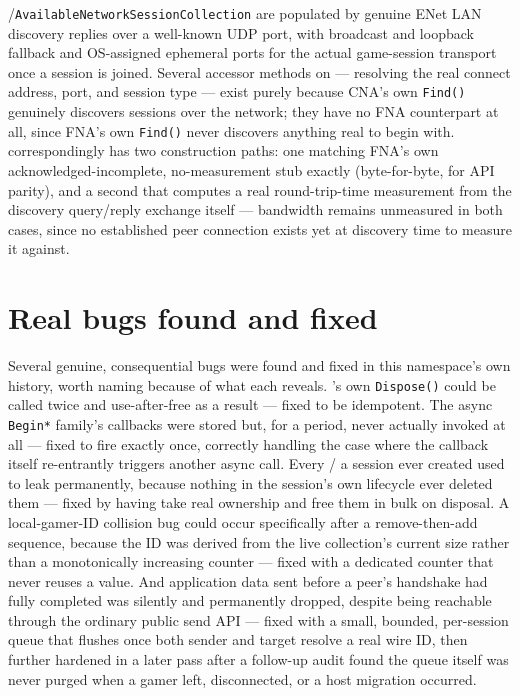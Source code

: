 /\texttt{AvailableNetworkSessionCollection} are populated by
genuine ENet LAN discovery replies over a well-known UDP port, with broadcast and loopback
fallback and OS-assigned ephemeral ports for the actual game-session transport once a session
is joined. Several accessor methods on  --- resolving the
real connect address, port, and session type --- exist purely because CNA's own
\texttt{Find()} genuinely discovers sessions over the network; they have no FNA counterpart
at all, since FNA's own \texttt{Find()} never discovers anything real to begin with.
 correspondingly has two construction paths: one matching FNA's
own acknowledged-incomplete, no-measurement stub exactly (byte-for-byte, for API parity), and
a second that computes a real round-trip-time measurement from the discovery query/reply
exchange itself --- bandwidth remains unmeasured in both cases, since no established peer
connection exists yet at discovery time to measure it against.

\section{Real bugs found and fixed}

Several genuine, consequential bugs were found and fixed in this namespace's own history,
worth naming because of what each reveals. 's own
\texttt{Dispose()} could be called twice and use-after-free as a result --- fixed to be
idempotent. The async \texttt{Begin*} family's callbacks were stored but, for a period, never
actually invoked at all --- fixed to fire exactly once, correctly handling the case where the
callback itself re-entrantly triggers another async call. Every /%
 a session ever created used to leak permanently, because nothing
in the session's own lifecycle ever deleted them --- fixed by having 
take real ownership and free them in bulk on disposal. A local-gamer-ID collision bug could
occur specifically after a remove-then-add sequence, because the ID was derived from the
live collection's current size rather than a monotonically increasing counter --- fixed with a
dedicated counter that never reuses a value. And application data sent before a peer's
handshake had fully completed was silently and permanently dropped, despite being reachable
through the ordinary public send API --- fixed with a small, bounded, per-session queue that
flushes once both sender and target resolve a real wire ID, then further hardened in a later
pass after a follow-up audit found the queue itself was never purged when a gamer left,
disconnected, or a host migration occurred.


